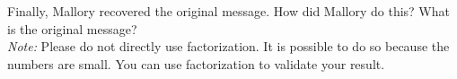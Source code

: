 \documentclass{article}
\begin{document}
\noindent Finally, Mallory recovered the original message. How did
Mallory do this? What is the original message?\\

\noindent \emph{Note:} Please do not directly use factorization. It is
possible to do so because the numbers are small. You can use
factorization to validate your result.\\

\\
\end{document}
